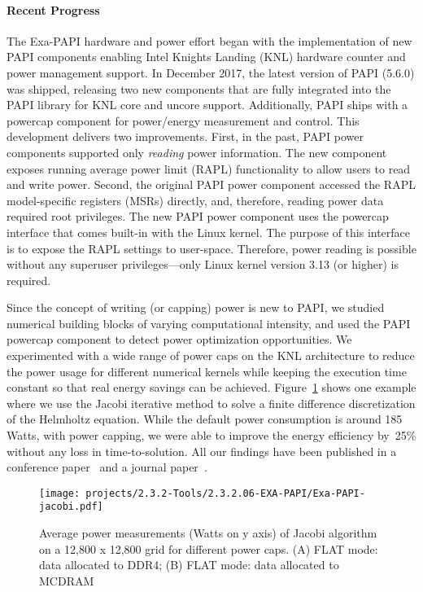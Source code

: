\paragraph{Recent Progress}

The Exa-PAPI hardware and power effort began with the implementation of new
PAPI components enabling Intel Knights Landing (KNL) hardware counter and power
management support. In December 2017, the latest version of PAPI (5.6.0) was
shipped, releasing two new components that are fully integrated into the PAPI library for 
KNL core and uncore support. Additionally, PAPI ships with a powercap component for 
power/energy measurement and control. This development delivers two improvements. 
First, in the past, PAPI power components supported only \emph{reading} power information. 
The new component exposes running average power limit (RAPL) functionality to allow users 
to read and write power. Second, the original PAPI power component accessed the RAPL 
model-specific registers (MSRs) directly, and, therefore, reading
power data required root privileges. The new PAPI power component uses the
powercap interface that comes built-in with the Linux kernel. The purpose of this
interface is to expose the RAPL settings to user-space. Therefore, power
reading is possible without any superuser privileges---only Linux kernel version
3.13 (or higher) is required.

Since the concept of writing (or capping) power is new to PAPI, we studied
numerical building blocks of varying computational intensity, and used the PAPI
powercap component to detect power optimization opportunities. We experimented
with a wide range of power caps on the KNL architecture to reduce
the power usage for different numerical kernels while keeping the execution
time constant so that real energy savings can be achieved.
Figure~\ref{fig:Jacobi_power} shows one example where we use
the Jacobi iterative method to solve a finite difference discretization of the
Helmholtz equation. While the default power consumption is around 185 Watts,
with power capping, we were able to improve the energy efficiency by~25\%
without any loss in time-to-solution. All our findings have been published in a
conference paper~\cite{power1} and a journal paper~\cite{power2}.
%
\vspace{-4pt}
\begin{figure}[!h]
\begin{center}
\texttt{[image: projects/2.3.2-Tools/2.3.2.06-EXA-PAPI/Exa-PAPI-jacobi.pdf]}
\caption{Average power measurements (Watts on y axis) of Jacobi algorithm on a 
12,800 x 12,800 grid for different power caps. (A) FLAT mode: data allocated to DDR4; 
(B) FLAT mode: data allocated to MCDRAM}
\label{fig:Jacobi_power}
\end{center}
\end{figure}
%
\vspace{-8pt}

